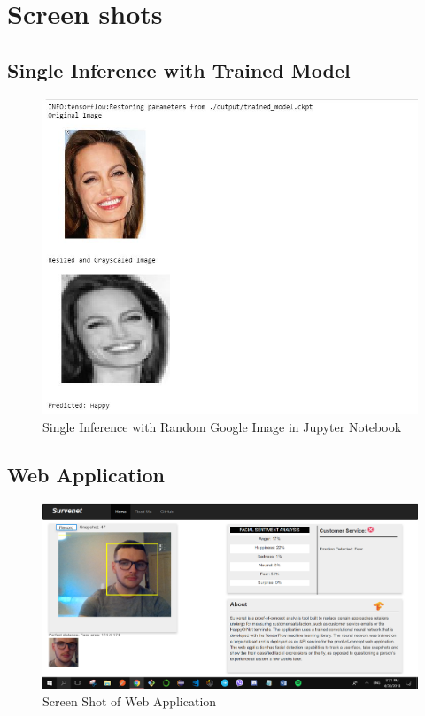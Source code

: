 \section{Screen shots}

\subsection{Single Inference with Trained Model}

\begin{figure}[ht]
	\begin{center}
		\advance\leftskip-3cm
		\advance\rightskip-3cm
		\includegraphics[keepaspectratio=true,scale=1]{__resources/Appendix/single.jpg}
		\caption{Single Inference with Random Google Image in Jupyter Notebook}
		\label{ui}
	\end{center}
\end{figure}

\newpage
\subsection{Web Application}

\begin{figure}[ht]
	\begin{center}
		\advance\leftskip-3cm
		\advance\rightskip-3cm
		\includegraphics[keepaspectratio=true,scale=.3]{__resources/Appendix/screenshot.png}
		\caption{Screen Shot of Web Application}
		\label{screenshot}
	\end{center}
\end{figure}

